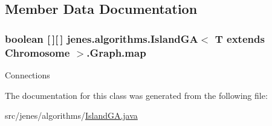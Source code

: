 \subsection{Member Data Documentation}
\hypertarget{classjenes_1_1algorithms_1_1_island_g_a_3_01_t_01extends_01_chromosome_01_4_1_1_graph_af71354252298085f8de138e9f47e789a}{
\subsubsection[{map}]{\setlength{\rightskip}{0pt plus 5cm}boolean \mbox{[}$\,$\mbox{]}\mbox{[}$\,$\mbox{]} jenes.\-algorithms.\-Island\-G\-A$<$ T extends Chromosome $>$.Graph.\-map\hspace{0.3cm}{\ttfamily [private]}}}\label{classjenes_1_1algorithms_1_1_island_g_a_3_01_t_01extends_01_chromosome_01_4_1_1_graph_af71354252298085f8de138e9f47e789a}
Connections 

The documentation for this class was generated from the following file\-:\begin{DoxyCompactItemize}
\item 
src/jenes/algorithms/\hyperlink{_island_g_a_8java}{Island\-G\-A.\-java}\end{DoxyCompactItemize}
